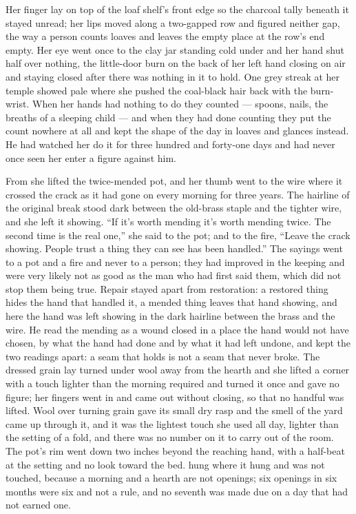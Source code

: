 Her finger lay on top of the loaf shelf's front edge so the charcoal tally beneath it stayed unread; her lips moved along a two-gapped row and figured neither gap, the way a person counts loaves and leaves the empty place at the row's end empty. Her eye went once to the clay jar standing cold under  and her hand shut half over nothing, the little-door burn on the back of her left hand closing on air and staying closed after there was nothing in it to hold. One grey streak at her temple showed pale where she pushed the coal-black hair back with the burn-wrist. When her hands had nothing to do they counted --- spoons, nails, the breaths of a sleeping child --- and when they had done counting they put the count nowhere at all and kept the shape of the day in loaves and glances instead. He had watched her do it for three hundred and forty-one days and had never once seen her enter a figure against him.

From  she lifted the twice-mended pot, and her thumb went to the wire where it crossed the crack as it had gone on every morning for three years. The hairline of the original break stood dark between the old-brass staple and the tighter wire, and she left it showing. “If it's worth mending it's worth mending twice. The second time is the real one,” she said to the pot; and to the fire, “Leave the crack showing. People trust a thing they can see has been handled.” The sayings went to a pot and a fire and never to a person; they had improved in the keeping and were very likely not as good as the man who had first said them, which did not stop them being true. Repair stayed apart from restoration: a restored thing hides the hand that handled it, a mended thing leaves that hand showing, and here the hand was left showing in the dark hairline between the brass and the wire. He read the mending as a wound closed in a place the hand would not have chosen, by what the hand had done and by what it had left undone, and kept the two readings apart: a seam that holds is not a seam that never broke. The dressed grain lay turned under wool away from the hearth and she lifted a corner with a touch lighter than the morning required and turned it once and gave no figure; her fingers went in and came out without closing, so that no handful was lifted. Wool over turning grain gave its small dry rasp and the smell of the yard came up through it, and it was the lightest touch she used all day, lighter than the setting of a fold, and there was no number on it to carry out of the room. The pot's rim went down two inches beyond the reaching hand, with a half-beat at the setting and no look toward the bed.  hung where it hung and was not touched, because a morning and a hearth are not openings; six openings in six months were six and not a rule, and no seventh was made due on a day that had not earned one.

